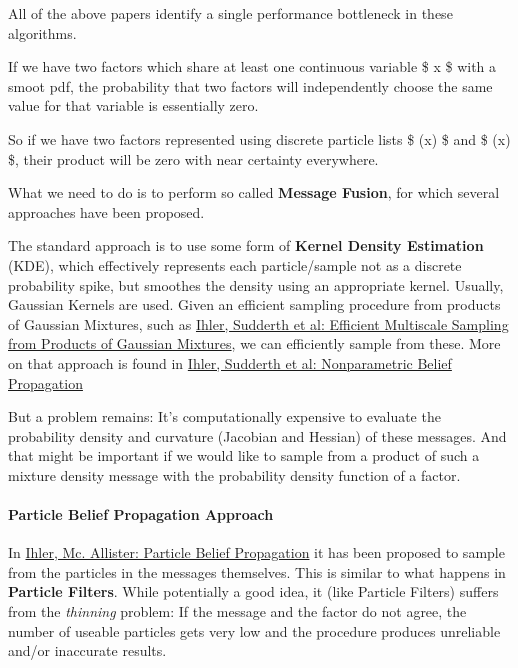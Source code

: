 All of the above papers identify a single performance bottleneck in
these algorithms.

If we have two factors which share at least one continuous variable \$ x
\$ with a smoot pdf, the probability that two factors will independently
choose the same value for that variable is essentially zero.

So if we have two factors represented using discrete particle lists \$
\phi(x) \$ and \$ \theta(x) \$, their product will be zero with near
certainty everywhere.

What we need to do is to perform so called \textbf{Message Fusion}, for
which several approaches have been proposed.

The standard approach is to use some form of \textbf{Kernel Density
Estimation} (KDE), which effectively represents each particle/sample not
as a discrete probability spike, but smoothes the density using an
appropriate kernel. Usually, Gaussian Kernels are used. Given an
efficient sampling procedure from products of Gaussian Mixtures, such as
\href{http://ssg.mit.edu/nbp/papers/nips03.pdf}{Ihler, Sudderth et al:
Efficient Multiscale Sampling from Products of Gaussian Mixtures}, we
can efficiently sample from these. More on that approach is found in
\href{http://ssg.mit.edu/nbp/papers/nips03.pdf}{Ihler, Sudderth et al:
Nonparametric Belief Propagation}

But a problem remains: It's computationally expensive to evaluate the
probability density and curvature (Jacobian and Hessian) of these
messages. And that might be important if we would like to sample from a
product of such a mixture density message with the probability density
function of a factor.

\paragraph{Particle Belief Propagation Approach}

In
\href{http://machinelearning.wus\%20tl.edu/mlpapers/paper\_files/AISTATS09\_IhlerM.pdf}{Ihler,
Mc. Allister: Particle Belief Propagation} it has been proposed to
sample from the particles in the messages themselves. This is similar to
what happens in \textbf{Particle Filters}. While potentially a good
idea, it (like Particle Filters) suffers from the \emph{thinning}
problem: If the message and the factor do not agree, the number of
useable particles gets very low and the procedure produces unreliable
and/or inaccurate results.

